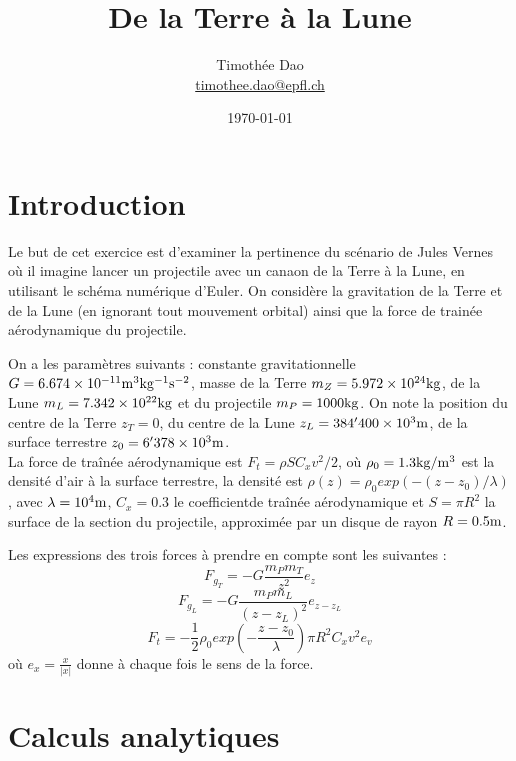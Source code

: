 \documentclass[a4paper,12pt,twoside]{article}
\def \be {\begin{equation}}
\def \ee {\end{equation}}
\newcommand{\mail}[1]{{\href{mailto:#1}{#1}}}
\begin{document}
\title{De la Terre à la Lune}
\author{Timothée Dao\\  %
{\small \mail{timothee.dao@epfl.ch}}}
\date{\today}\maketitle
\baselineskip=16pt
\parindent=0pt
\parskip=12pt


\section{Introduction} %

Le but de cet exercice est d'examiner la pertinence du scénario de Jules Vernes où il imagine lancer un projectile avec un canaon de la Terre à la Lune, en utilisant le schéma numérique d'Euler. On considère la gravitation de la Terre et de la Lune (en ignorant tout mouvement orbital) ainsi que la force de trainée aérodynamique du projectile. 

On a les paramètres suivants : constante gravitationnelle $G=6.674 \times 10^{-11}  \rm m^3kg^{-1}s^{-2}$, masse de la Terre $m_Z=5.972  \times 10^{24} \rm kg$, de la Lune $m_L=7.342 \times 10^{22} \rm kg$ et du projectile $m_P=1000 \rm kg$. On note la position du centre de la Terre $z_T=0$, du centre de la Lune $z_L=384'400 \times 10^{3} \rm m$, de la surface terrestre $z_0=6'378 \times 10^{3} \rm m$. \\
La force de traînée aérodynamique est $F_t=\rho SC_xv^2/2$, où $\rho_0=1.3 \rm kg/m^3$ est la densité d'air à la surface terrestre, la densité est $\rho(z)=\rho_0exp(-(z-z_0)/\lambda)$, avec $\lambda=10^4 \rm m$, $C_x=0.3$ le coefficientde traînée aérodynamique et $S=\pi R^2$ la surface de la section du projectile, approximée par un disque de rayon $R=0.5 \rm m$.

Les expressions des trois forces à prendre en compte sont les suivantes :
\be \label{ForceTerre} 
F_{g_T}=-G \frac{m_P m_T}{z^2} e_z
\ee
\be \label{ForceLune} 
F_{g_L}=-G \frac{m_P       m_L}{(z-z_L)^2} e_{z-z_L}
\ee
\be \label{ForceTrainee}
F_t=-\frac{1}{2} \rho_0 exp{(-\frac{z-z_0}{\lambda})} \pi R^2 C_x v^2  e_v
\ee
où $e_x=\frac{x}{\lvert x \rvert}$ donne à chaque fois le sens de la force.

\section{Calculs analytiques}
\end{document}
